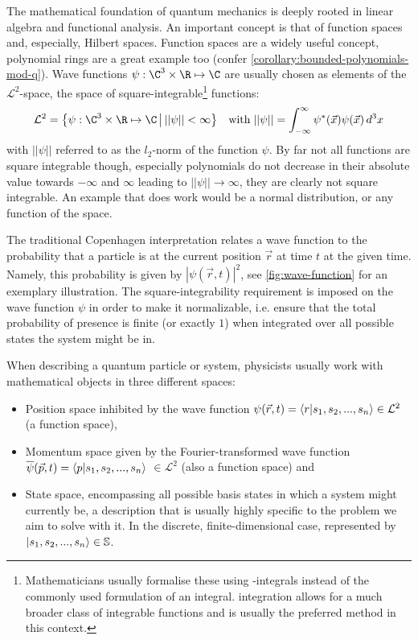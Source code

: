 The mathematical foundation of quantum mechanics is deeply rooted in linear algebra and functional analysis.
An important concept is that of function spaces and, especially, Hilbert spaces.
Function spaces are a widely useful concept, polynomial rings are a great example too (confer \cref{corollary:bounded-polynomials-mod-q}).
Wave functions $\psi: \C^3 \times \R \mapsto \C$ are usually chosen as elements of the $\mathcal{L}^2$-space, the space of square-integrable\footnote{Mathematicians usually formalise these using -integrals instead of the commonly used  formulation of an integral.  integration allows for a much broader class of integrable functions and is usually the preferred method in this context.} functions:
$$\mathcal{L}^2 = \big\{\psi: \C^3 \times \R \mapsto \C \,\big|\, ||\psi|| < \infty\big\} \quad \text{with} \; ||\psi|| = \int_{-\infty}^{\infty} \psi^*(\vec{x}) \psi(\vec{x}) \,d^3x$$
with $||\psi||$ referred to as the $l_2$-norm of the function $\psi$.
By far not all functions are square integrable though, especially polynomials do not decrease in their absolute value towards $-\infty$ and $\infty$ leading to $||\psi|| \rightarrow \infty$, they are clearly not square integrable.
An example that does work would be a normal distribution, or any function of the  space.

The traditional Copenhagen interpretation relates a wave function to the probability that a particle is at the current position $\vec{r}$ at time $t$ at the given time.
Namely, this probability is given by $|\psi(\vec{r}, t)|^2$, see \cref{fig:wave-function} for an exemplary illustration.
The square-integrability requirement is imposed on the wave function $\psi$ in order to make it normalizable, i.e. ensure that the total probability of presence is finite (or exactly $1$) when integrated over all possible states the system might be in.

When describing a quantum particle or system, physicists usually work with mathematical objects in three different spaces:
\begin{itemize}
  \item Position space inhibited by the wave function $\psi(\vec{r}, t) = \braket{r | s_1, s_2, ..., s_n} \in \mathcal{L}^2$ (a function space),
  \item Momentum space given by the Fourier-transformed wave function $\overline{\psi}(\vec{p}, t) = \braket{p | s_1, s_2, ..., s_n}$ $\in \mathcal{L}^2$ (also a function space) and
  \item State space, encompassing all possible basis states in which a system might currently be, a description that is usually highly specific to the problem we aim to solve with it.
        In the discrete, finite-dimensional case, represented by $\ket{s_1, s_2, ..., s_n} \in \mathbb{S}$.
\end{itemize}

